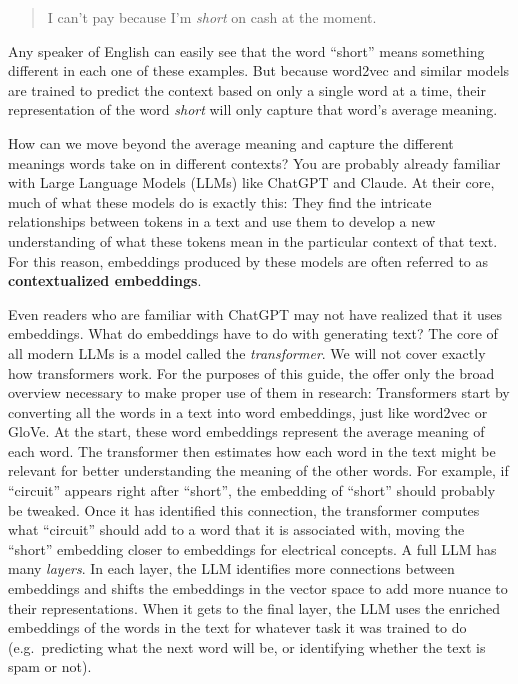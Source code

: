 \documentclass[
  man,
  floatsintext,
  longtable,
  nolmodern,
  notxfonts,
  notimes,
  colorlinks=true,linkcolor=blue,citecolor=blue,urlcolor=blue]{apa7}
\begin{document}
\begin{quote}
I can't pay because I'm \emph{short} on cash at the moment.
\end{quote}

Any speaker of English can easily see that the word ``short'' means
something different in each one of these examples. But because word2vec
and similar models are trained to predict the context based on only a
single word at a time, their representation of the word \emph{short}
will only capture that word's average meaning.

How can we move beyond the average meaning and capture the different
meanings words take on in different contexts? You are probably already
familiar with Large Language Models (LLMs) like ChatGPT and Claude. At
their core, much of what these models do is exactly this: They find the
intricate relationships between tokens in a text and use them to develop
a new understanding of what these tokens mean in the particular context
of that text. For this reason, embeddings produced by these models are
often referred to as \textbf{contextualized embeddings}.

Even readers who are familiar with ChatGPT may not have realized that it
uses embeddings. What do embeddings have to do with generating text? The
core of all modern LLMs is a model called the \emph{transformer}. We
will not cover exactly how transformers work. For the purposes of this
guide, the offer only the broad overview necessary to make proper use of
them in research: Transformers start by converting all the words in a
text into word embeddings, just like word2vec or GloVe. At the start,
these word embeddings represent the average meaning of each word. The
transformer then estimates how each word in the text might be relevant
for better understanding the meaning of the other words. For example, if
``circuit'' appears right after ``short'', the embedding of ``short''
should probably be tweaked. Once it has identified this connection, the
transformer computes what ``circuit'' should add to a word that it is
associated with, moving the ``short'' embedding closer to embeddings for
electrical concepts. A full LLM has many \emph{layers}. In each layer,
the LLM identifies more connections between embeddings and shifts the
embeddings in the vector space to add more nuance to their
representations. When it gets to the final layer, the LLM uses the
enriched embeddings of the words in the text for whatever task it was
trained to do (e.g.~predicting what the next word will be, or
identifying whether the text is spam or not).
\end{document}
